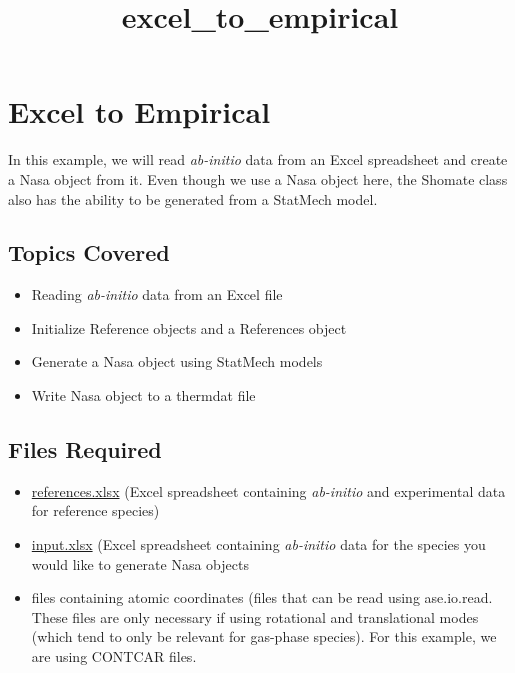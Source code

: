 \documentclass[11pt]{article}
\title{excel\_to\_empirical}
\providecommand{\tightlist}{%
      \setlength{\itemsep}{0pt}\setlength{\parskip}{0pt}}
\begin{document}
    
    
    \maketitle
    
    

    
    \section{Excel to Empirical}\label{excel-to-empirical}

In this example, we will read \emph{ab-initio} data from an Excel
spreadsheet and create a Nasa object from it. Even though we use a Nasa
object here, the Shomate class also has the ability to be generated from
a StatMech model.

\subsection{Topics Covered}\label{topics-covered}

\begin{itemize}
\tightlist
\item
  Reading \emph{ab-initio} data from an Excel file
\item
  Initialize Reference objects and a References object
\item
  Generate a Nasa object using StatMech models
\item
  Write Nasa object to a thermdat file
\end{itemize}

\subsection{Files Required}\label{files-required}

\begin{itemize}
\tightlist
\item
  \url{references.xlsx} (Excel spreadsheet containing \emph{ab-initio}
  and experimental data for reference species)
\item
  \url{input.xlsx} (Excel spreadsheet containing \emph{ab-initio} data
  for the species you would like to generate Nasa objects
\item
  files containing atomic coordinates (files that can be read using
  ase.io.read. These files are only necessary if using rotational and
  translational modes (which tend to only be relevant for gas-phase
  species). For this example, we are using CONTCAR files.
\end{itemize}
\end{document}
